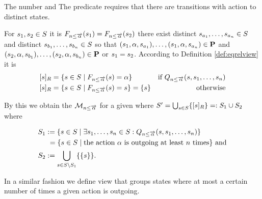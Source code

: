 \documentclass[preview]{standalone}
\begin{document}
The number  and  
The predicate \predminoutact requires that there are transitions with action \action to \numoutact distinct states.

For ${s}_1,{s}_2 \in {S}$ it is ${{F_{{{n}\leq{\overrightarrow{\ensuremath{{\alpha}}}}}}}}({s}_1) = {{F_{{{n}\leq{\overrightarrow{\ensuremath{{\alpha}}}}}}}}({s}_2)$ \iffN there exist distinct ${s}_{a_1}, \dots, {s}_{a_{n}} \in {S}$ and distinct ${s}_{b_1}, \dots, {s}_{b_{n}} \in {S}$ so that $({s}_1, {\alpha}, {s}_{a_1}), \dots, ({s}_1, {\alpha}, {s}_{a_{n}}) \in {\ensuremath{{\textbf{P}}}}$ and $({s}_2, {\alpha}, {s}_{b_1}), \dots, ({s}_2, {\alpha}, {s}_{b_{n}}) \in {\ensuremath{{\textbf{P}}}}$ or ${s}_1 = {s}_2$. According to Definition \ref{def:eqrelview} it is 
\begin{align*}
	\eqclassv &= \{\state \in \states \mid \gfctminoutaction(\state) = \action\} &\text{if } \predminoutact \\ 
	\eqclassv &= \{\state \in \states \mid \gfctminoutaction(\state) = \state\} = \{\state\} &\text{ otherwise}
\end{align*}

By this we obtain the \viewN ${{{{{\mathcal{M}}}}_{{{n}\leq{\overrightarrow{\ensuremath{{\alpha}}}}}}}}$ for a given \chgphN \chgph where ${S}' = \bigcup_{{s} \in {S}} \{{{[{s}]_{{R}}}}\} =: {S}_1 \cup {S}_2$ where 

\begin{align*}
	\states_1 &:= \{\state \in \states \mid \exists \state_1, \dots, \state_\numoutact \in \states: \predminoutact\} \\ %
	&\hspace{1.15mm}= \{\state \in \states \mid \text{the action } \action \text{ is outgoing at least } \numoutact \text{ times} \} \text{ and} \\
	\states_2 &:= \remstates.	
\end{align*}

In a similar fashion we define view that groups states where at most a certain number of times a given action is outgoing. 
\end{document}
